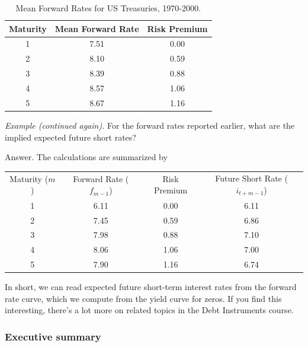 \documentclass[letterpaper,12pt]{article}
\begin{document}
\begin{table}[h]
\centering
\begin{tabular}{ccc}
\hline\hline
        Maturity   &    Mean Forward Rate   &  Risk Premium \\
\hline\hline
            1  &  7.51 &  0.00 \\
            2  &  8.10 &  0.59 \\
            3  &  8.39 &  0.88 \\
            4  &  8.57 &  1.06 \\
            5  &  8.67 &  1.16  \\
\hline\hline
\end{tabular}
\caption{Mean Forward Rates for US Treasuries, 1970-2000.}
\label{tab:meanrates}
\end{table}


{\it Example (continued again).\/} For the forward rates reported
earlier, what are the implied expected future short rates?

Answer.  The calculations are summarized by
%
\begin{center}
\begin{tabular}{cccc}
  Maturity ($m$) & Forward Rate ($f_{m-1}$) & Risk Premium & Future Short Rate ($i_{t+m-1}$) \\
     1      &   6.11       &    0.00      &    6.11 \\
     2      &   7.45       &    0.59      &    6.86  \\
     3      &   7.98       &    0.88      &    7.10  \\
     4      &   8.06       &    1.06      &    7.00  \\
     5      &   7.90       &    1.16      &    6.74
\end{tabular}
\end{center}
%

In short, we can read expected future short-term interest rates
from the forward rate curve, which we compute from the yield curve
for zeros.  If you find this interesting, there's a lot more on
related topics in the Debt Instruments course.


\subsubsection*{Executive summary}
\end{document}
